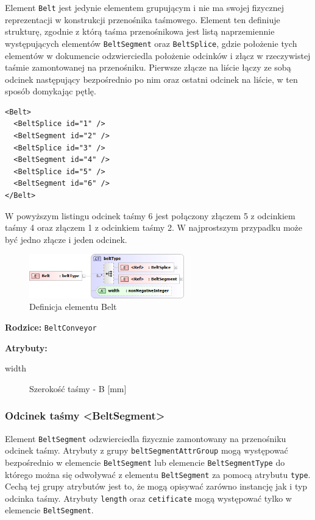 \documentclass[12pt,a4paper]{article}
\begin{document}
Element {\tt Belt} jest jedynie elementem grupującym i nie ma swojej fizycznej
reprezentacji w konstrukcji przenośnika taśmowego. Element ten definiuje
strukturę, zgodnie z którą taśma przenośnikowa jest listą naprzemiennie
występujących elementów {\tt BeltSegment} oraz {\tt BeltSplice}, gdzie położenie
tych elementów w dokumencie odzwierciedla położenie odcinków i złącz w
rzeczywistej taśmie zamontowanej na przenośniku. Pierwsze złącze na liście łączy
ze sobą odcinek następujący bezpośrednio po nim oraz ostatni odcinek na liście,
w ten sposób domykając pętlę.

\begin{verbatim}
<Belt>
  <BeltSplice id="1" />
  <BeltSegment id="2" />
  <BeltSplice id="3" />
  <BeltSegment id="4" />
  <BeltSplice id="5" />
  <BeltSegment id="6" />
</Belt>
\end{verbatim}

W powyższym listingu odcinek taśmy 6 jest połączony złączem 5 z odcinkiem taśmy
4 oraz złączem 1 z odcinkiem taśmy 2. W najprostszym przypadku może być jedno
złącze i jeden odcinek.

\begin{figure}[H]
  \centering
  \includegraphics[width=0.6\textwidth]{png/belt_xsd2}
  \caption{Definicja elementu Belt}
  \label{fig:belt-xsd}
\end{figure}

\noindent\textbf{Rodzice:} \texttt{BeltConveyor}

\noindent\textbf{Atrybuty:}
\begin{description}
\item[width] Szerokość taśmy - B [mm]
\end{description}


\subsubsection{Odcinek taśmy <BeltSegment>}
Element {\tt BeltSegment} odzwierciedla fizycznie zamontowany na przenośniku
odcinek taśmy.  Atrybuty z grupy {\tt beltSegmentAttrGroup} mogą występować
bezpośrednio w elemencie {\tt BeltSegment} lub elemencie {\tt BeltSegmentType}
do którego można się odwoływać z elementu {\tt BeltSegment} za pomocą atrybutu
{\tt type}.  Cechą tej grupy atrybutów jest to, że mogą opisywać zarówno
instancję jak i typ odcinka taśmy. Atrybuty {\tt length} oraz {\tt cetificate}
mogą występować tylko w elemencie {\tt BeltSegment}.
\end{document}
